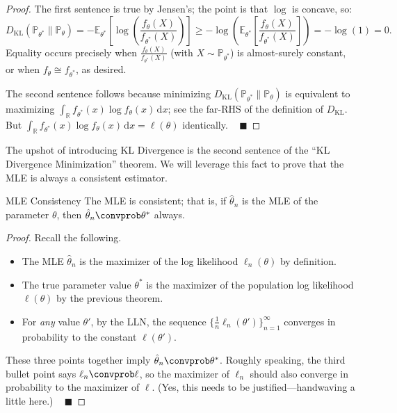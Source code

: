 \begin{proof}
    The first sentence is true by Jensen's; the point is that $\log$ is concave, so:
    \[ D_{\mathrm{KL}}(\mathbb{P}_{\theta^*} \parallel \mathbb{P}_{\theta})
    = -\mathbb{E}_{\theta^*} \left[ \log \left(\frac{f_{\theta}(X)}{f_{\theta^*}(X)}\right) \right]
    \geq -\log \left( \mathbb{E}_{\theta^*} \left[ \frac{f_{\theta}(X)}{f_{\theta^*}(X)} \right] \right)
    = -\log(1) = 0. \]
    Equality occurs precisely when $\frac{f_{\theta}(X)}{f_{\theta^*}(X)}$
    (with $X \sim \mathbb{P}_{\theta^*}$) is almost-surely constant,
    or when $f_{\theta} \cong f_{\theta^*}$, as desired.

    The second sentence follows because minimizing
    $D_{\mathrm{KL}}(\mathbb{P}_{\theta^*} \parallel \mathbb{P}_{\theta})$
    is equivalent to maximizing
    $\int_{\mathbb{R}} f_{\theta^*}(x) \log f_{\theta}(x) \, \mathrm{d}x$;
    see the far-RHS of the definition of $D_{\mathrm{KL}}$.
    But $\int_{\mathbb{R}} f_{\theta^*}(x) \log f_{\theta}(x) \, \mathrm{d}x = \ell(\theta)$
    identically. ~ $\blacksquare$
\end{proof}

The upshot of introducing KL Divergence is the second sentence of the
``KL Divergence Minimization'' theorem.
We will leverage this fact to prove that the MLE is always a consistent estimator.

\begin{theorem}{MLE Consistency}
    The MLE is consistent; that is, if $\hat{\theta}_n$ is the MLE of the parameter $\theta$,
    then $\hat{\theta}_n \convprob \theta^*$ always.
\end{theorem}

\begin{proof}
    Recall the following.
    \begin{itemize}
        \item The MLE $\hat{\theta}_n$ is
        the maximizer of the log likelihood $\ell_n(\theta)$ by definition.
        \item The true parameter value $\theta^*$ is
        the maximizer of the population log likelihood $\ell(\theta)$
        by the previous theorem.
        \item For \emph{any} value $\theta'$,
        by the LLN, the sequence $\{\frac{1}{n}\ell_n(\theta')\}_{n = 1}^{\infty}$
        converges in probability to the constant $\ell(\theta')$.
    \end{itemize}
    These three points together imply $\hat{\theta}_n \convprob \theta^*$.
    Roughly speaking, the third bullet point says $\ell_n \convprob \ell$,
    so the maximizer of $\ell_n$ should also converge in probability
    to the maximizer of $\ell$.
    (Yes, this needs to be justified---handwaving a little here.) ~ $\blacksquare$
\end{proof}


